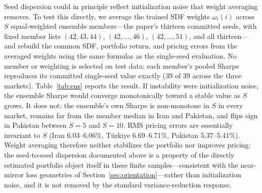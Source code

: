 \documentclass[12pt]{article}
\begin{document}
Seed dispersion could in principle reflect initialization noise that weight averaging removes. To test this directly, we average the trained SDF weights $\omega_t(i)$ across $S$ equal-weighted ensemble members---the paper's thirteen committed seeds, with fixed member lists $(42,43,44)$, $(42,\dots,46)$, $(42,\dots,51)$, and all thirteen---and rebuild the common SDF, portfolio return, and pricing errors from the averaged weights using the same formulas as the single-seed evaluation. No member or weighting is selected on test data; each member's pooled Sharpe reproduces its committed single-seed value exactly (39 of 39 across the three markets). Table~\ref{tab:ens} reports the result. If instability were initialization noise, the ensemble Sharpe would converge monotonically toward a stable value as $S$ grows. It does not: the ensemble's own Sharpe is non-monotone in $S$ in every market, remains far from the member median in Iran and Pakistan, and flips sign in Pakistan between $S=5$ and $S=10$. RMS pricing errors are essentially invariant to $S$ (Iran 6.03--6.06\%, T\"urkiye 6.69--6.71\%, Pakistan 5.37--5.41\%). Weight averaging therefore neither stabilizes the portfolio nor improves pricing: the seed-to-seed dispersion documented above is a property of the directly estimated portfolio object itself in these finite samples---consistent with the near-mirror loss geometries of Section~\ref{sec:orientation}---rather than initialization noise, and it is not removed by the standard variance-reduction response.
\end{document}
